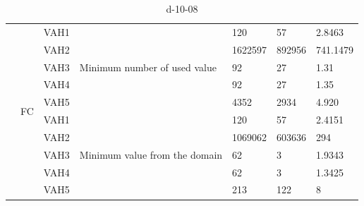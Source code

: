 \documentclass[14pt]{scrartcl} %
\begin{document}
\begin{table}[ht]
{\begin{tabular}{|l|l|l|l|l|l|l|}
                          & \multirow{10}{*}{FC} & VAH1 & \multirow{5}{*}{Minimum number of used value}  &   120     &     57        &     2.8463        \\ \cline{3-3} \cline{5-7} 
                          &                      & VAH2 &                                                & 1622597       &    892956          &      741.1479       \\ \cline{3-3} \cline{5-7} 
  \rowcolor{yellow}                          &                      & VAH3 &                                                &    92    &           27  & 1.31            \\ \cline{3-3} \cline{5-7} 
                          &                      & VAH4 &                                                &   92     &          27   & 1.35            \\ \cline{3-3} \cline{5-7} 
                          &                      & VAH5 &                                                &   4352     &    2934         &            4.920 \\ \cline{3-7} 
                          &                      & VAH1 & \multirow{5}{*}{Minimum value from the domain} &   120     & 57            &    2.4151         \\ \cline{3-3} \cline{5-7} 
                          &                      & VAH2 &                                                &1069062        &        603636     &  294           \\ \cline{3-3} \cline{5-7} 
                          &                      & VAH3 &                                                & 62       &  3           &    1.9343         \\ \cline{3-3} \cline{5-7} 
\rowcolor{green}              &                      & VAH4 &                                                &  62      &   3          &      1.3425       \\ \cline{3-3} \cline{5-7} 
                          &                      & VAH5 &                                                &   213     & 122            &   8          \\ \hline
\end{tabular}
}
\caption{d-10-08}
\end{table}
\end{document}
